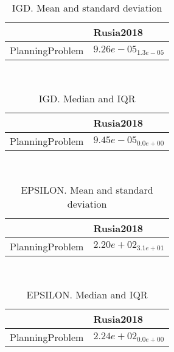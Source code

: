 \documentclass{article}
\begin{document}
\
\begin{table}
\caption{IGD. Mean and standard deviation}
\label{table:mean.IGD}
\centering
\begin{scriptsize}
\begin{tabular}{ll}
\hline &  Rusia2018\\
\hline
PlanningProblem & \cellcolor{gray95}$  9.26e-05_{ 1.3e-05}$ \\
\hline
\end{tabular}
\end{scriptsize}
\end{table}
\
\begin{table}
\caption{IGD. Median and IQR}
\label{table:median.IGD}
\begin{scriptsize}
\centering
\begin{tabular}{ll}
\hline &  Rusia2018\\
\hline
PlanningProblem & \cellcolor{gray95}$  9.45e-05_{ 0.0e+00}$ \\
\hline
\end{tabular}
\end{scriptsize}
\end{table}
\
\begin{table}
\caption{EPSILON. Mean and standard deviation}
\label{table:mean.EPSILON}
\centering
\begin{scriptsize}
\begin{tabular}{ll}
\hline &  Rusia2018\\
\hline
PlanningProblem & \cellcolor{gray95}$  2.20e+02_{ 3.1e+01}$ \\
\hline
\end{tabular}
\end{scriptsize}
\end{table}
\
\begin{table}
\caption{EPSILON. Median and IQR}
\label{table:median.EPSILON}
\begin{scriptsize}
\centering
\begin{tabular}{ll}
\hline &  Rusia2018\\
\hline
PlanningProblem & \cellcolor{gray95}$  2.24e+02_{ 0.0e+00}$ \\
\hline
\end{tabular}
\end{scriptsize}
\end{table}
\end{document}

